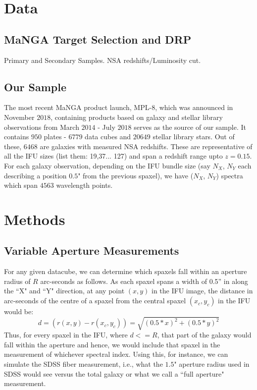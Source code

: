 \section{Data}

\subsection{MaNGA Target Selection and DRP}
\label{mangadrp}
Primary and Secondary Samples. NSA redshifts/Luminosity cut.

\subsection{Our Sample}
The most recent MaNGA product launch, MPL-$8$, which was announced in November $2018$, containing products based on galaxy and stellar library observations from March $2014$ - July $2018$ serves as the source of our sample. It contains $950$ plates - $6779$ data cubes and $20649$ stellar library stars. Out of these, $6468$ are galaxies with measured NSA redshifts. These are representative of all the IFU sizes (list them: 19,37... 127) and span a redshift range upto $z = 0.15$.\\
For each galaxy observation, depending on the IFU bundle size (say $N_{X}$, $N_{Y}$ each describing a position $0.5$" from the previous spaxel), we have ($N_{X}$, $N_{Y}$) spectra which span $4563$ wavelength points. 

\section{Methods}
\label{sec:chap2methods}

\subsection{Variable Aperture Measurements}
For any given datacube, we can determine which spaxels fall within an aperture radius of $R$ arc-seconds as follows. As each spaxel spans a width of 0.5'' in along the ``X" and ``Y" direction, at any point $(x,y)$ in the IFU image, the distance in arc-seconds of the centre of a spaxel from the central spaxel $(x_{c},y_{c})$ in the IFU would be:
$$ d = (r(x,y) - r(x_{c},y_{c})) = \sqrt{(0.5*x)^2 + (0.5*y)^2} $$
Thus, for every spaxel in the IFU, where $d<=R$, that part of the galaxy would fall within the aperture and hence, we would include that spaxel in the measurement of whichever spectral index. Using this, for instance, we can simulate the SDSS fiber measurement, i.e.,  what the $1.5$" aperture radius used in SDSS would see versus the total galaxy or what we call a ``full aperture" measurement.

